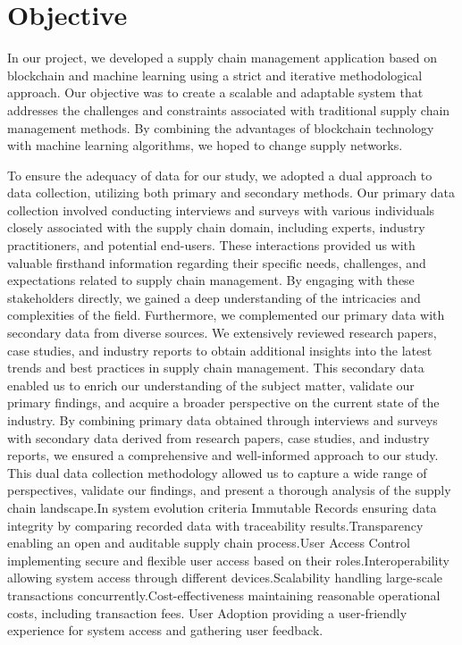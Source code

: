 \section{Objective}
\noindent In our project, we developed a supply chain management application based on blockchain and machine learning using a strict and iterative methodological approach. Our objective was to create a scalable and adaptable system that addresses the challenges and constraints associated with traditional supply chain management methods. By combining the advantages of blockchain technology with machine learning algorithms, we hoped to change supply networks.

\noindent To ensure the adequacy of data for our study, we adopted a dual approach to data collection, utilizing both primary and secondary methods. Our primary data collection involved conducting interviews and surveys with various individuals closely associated with the supply chain domain, including experts, industry practitioners, and potential end-users. These interactions provided us with valuable firsthand information regarding their specific needs, challenges, and expectations related to supply chain management. By engaging with these stakeholders directly, we gained a deep understanding of the intricacies and complexities of the field.
Furthermore, we complemented our primary data with secondary data from diverse sources. We extensively reviewed research papers, case studies, and industry reports to obtain additional insights into the latest trends and best practices in supply chain management. This secondary data enabled us to enrich our understanding of the subject matter, validate our primary findings, and acquire a broader perspective on the current state of the industry.
By combining primary data obtained through interviews and surveys with secondary data derived from research papers, case studies, and industry reports, we ensured a comprehensive and well-informed approach to our study. This dual data collection methodology allowed us to capture a wide range of perspectives, validate our findings, and present a thorough analysis of the supply chain landscape.\cite{bib5}In system evolution criteria Immutable Records ensuring data integrity by comparing recorded data with traceability results.Transparency enabling an open and auditable supply chain process.User Access Control implementing secure and flexible user access based on their roles.Interoperability allowing system access through different devices.Scalability handling large-scale transactions concurrently.Cost-effectiveness maintaining reasonable operational costs, including transaction fees. User Adoption providing a user-friendly experience for system access and gathering user feedback.
